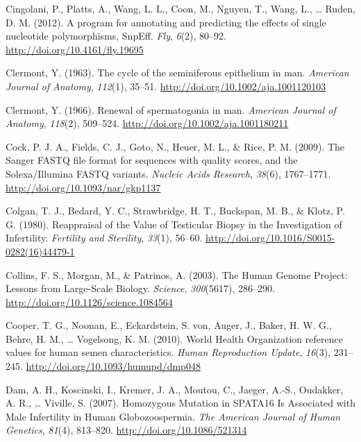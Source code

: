 \documentclass[12pt,twoside]{reedthesis}
\theoremstyle{definition}
\theoremstyle{definition}
\theoremstyle{remark}
\begin{document}
  \hypertarget{ref-Cingolani2012}{}
  Cingolani, P., Platts, A., Wang, L. L., Coon, M., Nguyen, T., Wang, L.,
  \ldots{} Ruden, D. M. (2012). A program for annotating and predicting
  the effects of single nucleotide polymorphisms, SnpEff. \emph{Fly},
  \emph{6}(2), 80--92. \url{http://doi.org/10.4161/fly.19695}
  
  \hypertarget{ref-Clermont1963}{}
  Clermont, Y. (1963). The cycle of the seminiferous epithelium in man.
  \emph{American Journal of Anatomy}, \emph{112}(1), 35--51.
  \url{http://doi.org/10.1002/aja.1001120103}
  
  \hypertarget{ref-Clermont1966}{}
  Clermont, Y. (1966). Renewal of spermatogonia in man. \emph{American
  Journal of Anatomy}, \emph{118}(2), 509--524.
  \url{http://doi.org/10.1002/aja.1001180211}
  
  \hypertarget{ref-Cock2009}{}
  Cock, P. J. A., Fields, C. J., Goto, N., Heuer, M. L., \& Rice, P. M.
  (2009). The Sanger FASTQ file format for sequences with quality scores,
  and the Solexa/Illumina FASTQ variants. \emph{Nucleic Acids Research},
  \emph{38}(6), 1767--1771. \url{http://doi.org/10.1093/nar/gkp1137}
  
  \hypertarget{ref-Colgan1980}{}
  Colgan, T. J., Bedard, Y. C., Strawbridge, H. T., Buckspan, M. B., \&
  Klotz, P. G. (1980). Reappraisal of the Value of Testicular Biopsy in
  the Investigation of Infertility. \emph{Fertility and Sterility},
  \emph{33}(1), 56--60. \url{http://doi.org/10.1016/S0015-0282(16)44479-1}
  
  \hypertarget{ref-Collins2003}{}
  Collins, F. S., Morgan, M., \& Patrinos, A. (2003). The Human Genome
  Project: Lessons from Large-Scale Biology. \emph{Science},
  \emph{300}(5617), 286--290. \url{http://doi.org/10.1126/science.1084564}
  
  \hypertarget{ref-Cooper2010}{}
  Cooper, T. G., Noonan, E., Eckardstein, S. von, Auger, J., Baker, H. W.
  G., Behre, H. M., \ldots{} Vogelsong, K. M. (2010). World Health
  Organization reference values for human semen characteristics.
  \emph{Human Reproduction Update}, \emph{16}(3), 231--245.
  \url{http://doi.org/10.1093/humupd/dmp048}
  
  \hypertarget{ref-Dam2007a}{}
  Dam, A. H., Koscinski, I., Kremer, J. A., Moutou, C., Jaeger, A.-S.,
  Oudakker, A. R., \ldots{} Viville, S. (2007). Homozygous Mutation in
  SPATA16 Is Associated with Male Infertility in Human Globozoospermia.
  \emph{The American Journal of Human Genetics}, \emph{81}(4), 813--820.
  \url{http://doi.org/10.1086/521314}
  
\end{document}
